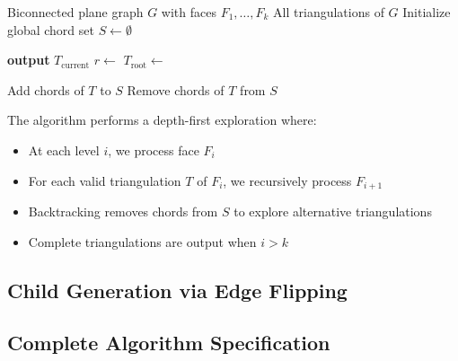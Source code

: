 \documentclass[12pt,a4paper]{article}
\theoremstyle{definition}
\theoremstyle{remark}
\begin{document}
\begin{algorithm}
\caption{Generate All Triangulations of Biconnected Plane Graph}
\label{alg:main}
\begin{algorithmic}[1]
\Require Biconnected plane graph $G$ with faces $F_1, \ldots, F_k$
\Ensure All triangulations of $G$
\State Initialize global chord set $S \gets \emptyset$
\State {}

        \State \textbf{output} $T_{\text{current}}$ 
        \State \Return
    \EndIf
    \State $r \gets$ 
    \State $T_{\text{root}} \gets$ 
    \State {}
\EndProcedure

    \State Add chords of $T$ to $S$
    \State {}
    \State Remove chords of $T$ from $S$
    
            \State {}
        \EndIf
    \EndFor
\EndProcedure
\end{algorithmic}
\end{algorithm}

The algorithm performs a depth-first exploration where:
\begin{itemize}
    \item At each level $i$, we process face $F_i$
    \item For each valid triangulation $T$ of $F_i$, we recursively process $F_{i+1}$
    \item Backtracking removes chords from $S$ to explore alternative triangulations
    \item Complete triangulations are output when $i > k$
\end{itemize}

\subsection{Child Generation via Edge Flipping}

\subsection{Complete Algorithm Specification}
\end{document}
